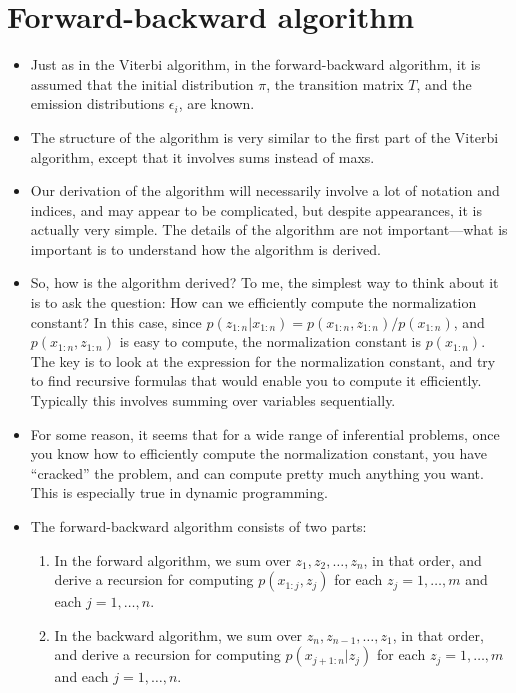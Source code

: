 \documentclass[12pt]{article}
\begin{document}
\section[Forward-backward algorithm (for probabilistic inference)]{Forward-backward algorithm}

\begin{itemize}
\item Just as in the Viterbi algorithm, in the forward-backward algorithm, it is assumed that the initial distribution $\pi$, the transition matrix $T$, and the emission distributions $\epsilon_i$, are known.
\item The structure of the algorithm is very similar to the first part of the Viterbi algorithm, except that it involves sums instead of maxs. 
\item Our derivation of the algorithm will necessarily involve a lot of notation and indices, and may appear to be complicated, but despite appearances, it is actually very simple.  The details of the algorithm are not important---what is important is to understand how the algorithm is derived.
\item So, how is the algorithm derived?  To me, the simplest way to  think about it is to ask the question: How can we efficiently compute the normalization constant? In this case, since $p(z_{1:n} | x_{1:n}) = p(x_{1:n},z_{1:n})/p(x_{1:n})$, and $p(x_{1:n},z_{1:n})$ is easy to compute, the normalization constant is $p(x_{1:n})$. The key is to look at the expression for the normalization constant, and try to find recursive formulas that would enable you to compute it efficiently. Typically this involves summing over variables sequentially.
\item For some reason, it seems that for a wide range of inferential problems, once you know how to efficiently compute the normalization constant, you have ``cracked'' the problem, and can compute pretty much anything you want. This is especially true in dynamic programming.
\item The forward-backward algorithm consists of two parts:
\begin{enumerate}
\item In the forward algorithm, we sum over $z_1,z_2,\ldots,z_n$, in that order, and derive a recursion for computing $p(x_{1:j},z_j)$ for each $z_j = 1,\ldots,m$ and each $j = 1,\ldots,n$.
\item In the backward algorithm, we sum over $z_n,z_{n -1},\ldots,z_1$, in that order, and derive a recursion for computing $p(x_{j +1:n} | z_j)$ for each $z_j = 1,\ldots,m$ and each $j = 1,\ldots,n$.

\end{enumerate}
\end{itemize}
\end{document}
